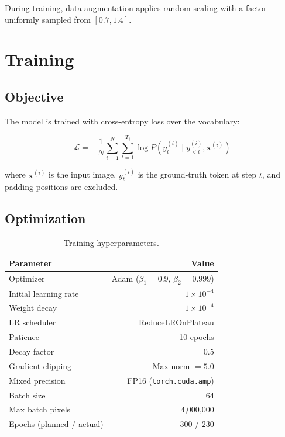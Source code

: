 \documentclass[11pt,a4paper]{article}
\begin{document}
During training, data augmentation applies random scaling with a factor uniformly sampled from $[0.7, 1.4]$.

\section{Training}
\label{sec:training}

\subsection{Objective}

The model is trained with cross-entropy loss over the vocabulary:

\begin{equation}
\mathcal{L} = -\frac{1}{N}\sum_{i=1}^{N}\sum_{t=1}^{T_i} \log P(y_t^{(i)} \mid y_{<t}^{(i)}, \mathbf{x}^{(i)})
\label{eq:loss}
\end{equation}

where $\mathbf{x}^{(i)}$ is the input image, $y_t^{(i)}$ is the ground-truth token at step $t$, and padding positions are excluded.

\subsection{Optimization}

\begin{table}[H]
\centering
\caption{Training hyperparameters.}
\label{tab:training}
\begin{tabular}{lr}
\toprule
\textbf{Parameter} & \textbf{Value} \\
\midrule
Optimizer              & Adam ($\beta_1{=}0.9$, $\beta_2{=}0.999$) \\
Initial learning rate  & $1 \times 10^{-4}$ \\
Weight decay           & $1 \times 10^{-4}$ \\
LR scheduler           & ReduceLROnPlateau \\
\quad Patience         & 10 epochs \\
\quad Decay factor     & 0.5 \\
Gradient clipping      & Max norm $= 5.0$ \\
Mixed precision        & FP16 (\texttt{torch.cuda.amp}) \\
Batch size             & 64 \\
Max batch pixels       & 4{,}000{,}000 \\
Epochs (planned / actual) & 300 / 230 \\
\bottomrule
\end{tabular}
\end{table}
\end{document}
